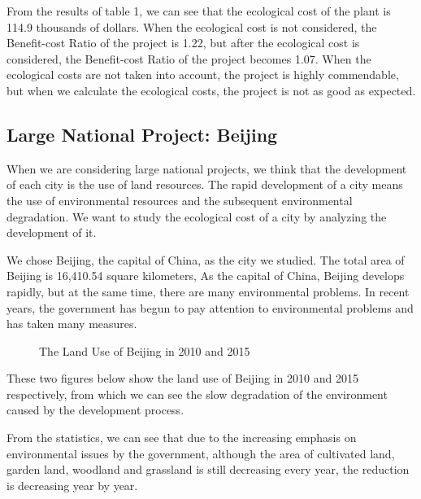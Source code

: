 \documentclass{mcmthesis}
\begin{document}
		From the results of table 1, we can see that the ecological cost of the plant is 114.9 thousands of dollars. When the ecological cost is not considered, the Benefit-cost Ratio of the project is 1.22, but after the ecological cost is considered, the Benefit-cost Ratio of the project becomes 1.07. When the ecological costs are not taken into account, the project is highly commendable, but when we calculate the ecological costs, the project is not as good as expected.
		
		
		\subsection{Large National Project:  Beijing}
		
		When we are considering large national projects, we think that the development of each city is the use of land resources. The rapid development of a city means the use of environmental resources and the subsequent environmental degradation. We want to study the ecological cost of a city by analyzing the development of it.
		
		We chose Beijing, the capital of China, as the city we studied. The total area of Beijing is 16,410.54 square kilometers, As the capital of China, Beijing develops rapidly, but at the same time, there are many environmental problems. In recent years, the government has begun to pay attention to environmental problems and has taken many measures.
		
		\begin{figure}[htbp]
			\centering
			\centering
			\caption{The Land Use of Beijing in 2010 and 2015}
		\end{figure}
		
		
		
		These two figures below show the land use of Beijing in 2010 and 2015 respectively, from which we can see the slow degradation of the environment caused by the development process.
		
		From the statistics, we can see that due to the increasing emphasis on environmental issues by the government, although the area of cultivated land, garden land, woodland and grassland is still decreasing every year, the reduction is decreasing year by year.
		
\end{document}
